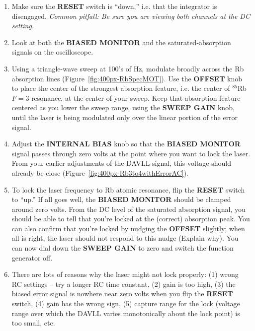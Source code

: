 \documentclass{../lab}
\begin{document}
\begin{enumerate}
    \item Make sure the \textbf{RESET} switch is ``down,'' i.e. that the integrator is disengaged. \emph{Common pitfall: Be sure you are viewing both channels at the DC setting.}

    \item Look at both the \textbf{BIASED MONITOR} and the saturated-absorption signals on the oscilloscope.

    \item Using a triangle-wave sweep at 100's of Hz, modulate broadly across the Rb absorption lines (Figure~\ref{fig:400px-RbSpecMOT}). Use the \textbf{OFFSET} knob to place the center of the strongest absorption feature, i.e. the center of $^{85}$Rb $F=3 $ resonance, at the center of your sweep. Keep that absorption feature centered as you lower the sweep range, using the \textbf{SWEEP GAIN} knob, until the laser is being modulated only over the linear portion of the error signal.

    \item Adjust the \textbf{INTERNAL BIAS} knob so that the \textbf{BIASED MONITOR} signal passes through zero volts at the point where you want to lock the laser. From your earlier adjustments of the DAVLL signal, this voltage should already be close (Figure~\ref{fig:400px-Rb3to4withErrorAC}).

    \item To lock the laser frequency to Rb atomic resonance, flip the \textbf{RESET} switch to ``up.'' If all goes well, the \textbf{BIASED MONITOR} should be clamped around zero volts. From the DC level of the saturated absorption signal, you should be able to tell that you're locked at the (correct) absorption peak. You can also confirm that you're locked by nudging the \textbf{OFFSET} slightly; when all is right, the laser should not respond to this nudge (Explain why). You can now dial down the \textbf{SWEEP GAIN} to zero and switch the function generator off.

    \item There are lots of reasons why the laser might not lock properly: (1) wrong RC settings -- try a longer RC time constant, (2) gain is too high, (3) the biased error signal is nowhere near zero volts when you flip the \textbf{RESET} switch, (4) gain has the wrong sign, (5) capture range for the lock (voltage range over which the DAVLL varies monotonically about the lock point) is too small, etc.
\end{enumerate}
\end{document}
